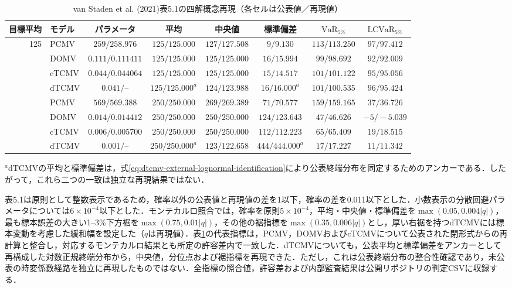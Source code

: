 \documentclass[10pt,a4paper]{article}
\theoremstyle{plain}
\theoremstyle{definition}
\DeclareMathOperator{\VaR}{VaR}
\begin{document}
\begin{table}[H]
\centering
\caption{van Staden et al. (2021)表5.1の四解概念再現（各セルは公表値／再現値）}
\label{tab:vanstaden-all-mv-validation}
\scriptsize
\setlength{\tabcolsep}{3.3pt}
\begin{tabular}{@{}rlcccccc@{}}
\toprule
目標平均 & モデル & パラメータ & 平均 & 中央値 & 標準偏差 & $\VaR_{5\%}$ & $\mathrm{LCVaR}_{5\%}$ \\
\midrule
125 & PCMV  & $259/258.976$ & $125/125.000$ & $127/127.508$ & $9/9.130$ & $113/113.250$ & $97/97.412$ \\
    & DOMV  & $0.111/0.111411$ & $125/125.000$ & $125/125.000$ & $16/15.994$ & $99/98.692$ & $92/92.009$ \\
    & cTCMV & $0.044/0.044064$ & $125/125.000$ & $125/125.000$ & $15/14.517$ & $101/101.122$ & $95/95.056$ \\
    & dTCMV & $0.041/\text{--}$ & $125/125.000^{a}$ & $124/123.988$ & $16/16.000^{a}$ & $101/100.535$ & $96/95.424$ \\
\addlinespace
250 & PCMV  & $569/569.388$ & $250/250.000$ & $269/269.389$ & $71/70.577$ & $159/159.165$ & $37/36.726$ \\
    & DOMV  & $0.014/0.014412$ & $250/250.000$ & $250/250.000$ & $124/123.643$ & $47/46.626$ & $-5/-5.039$ \\
    & cTCMV & $0.006/0.005700$ & $250/250.000$ & $250/250.000$ & $112/112.223$ & $65/65.409$ & $19/18.515$ \\
    & dTCMV & $0.001/\text{--}$ & $250/250.000^{a}$ & $123/122.658$ & $444/444.000^{a}$ & $17/17.227$ & $11/11.342$ \\
\bottomrule
\end{tabular}
\begin{minipage}{0.98\textwidth}\vspace{2pt}\scriptsize
$^{a}$dTCMVの平均と標準偏差は，式\eqref{eq:dtcmv-external-lognormal-identification}により公表終端分布を同定するためのアンカーである．したがって，これら二つの一致は独立な再現結果ではない．
\end{minipage}
\end{table}

表5.1は原則として整数表示であるため，確率以外の公表値と再現値の差を1以下，確率の差を0.011以下とした．小数表示の分散回避パラメータについては$6\times10^{-4}$以下とした．モンテカルロ照合では，確率を原則$5\times10^{-4}$，平均・中央値・標準偏差を$\max(0.05,0.004|q|)$，最も標本誤差の大きい1--3\%下方裾を$\max(0.75,0.01|q|)$，その他の裾指標を$\max(0.35,0.006|q|)$とし，厚い右裾を持つdTCMVには標本変動を考慮した緩和幅を設定した（$q$は再現値）．表\ref{tab:vanstaden-all-mv-validation}の代表指標は，PCMV，DOMVおよびcTCMVについて公表された閉形式からの再計算と整合し，対応するモンテカルロ結果とも所定の許容差内で一致した．dTCMVについても，公表平均と標準偏差をアンカーとして再構成した対数正規終端分布から，中央値，分位点および裾指標を再現できた．ただし，これは公表終端分布の整合性確認であり，未公表の時変係数経路を独立に再現したものではない．全指標の照合値，許容差および内部監査結果は公開リポジトリの判定CSVに収録する．
\end{document}
